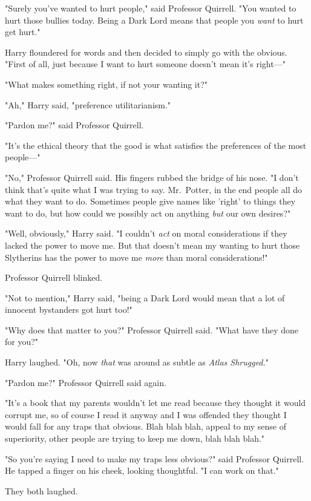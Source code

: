 "Surely you've wanted to hurt people," said Professor Quirrell. "You wanted to 
hurt those bullies today. Being a Dark Lord means that people you \emph{want} 
to hurt get hurt."

Harry floundered for words and then decided to simply go with the obvious. 
"First of all, just because I want to hurt someone doesn't mean it's right---"

"What makes something right, if not your wanting it?"

"Ah," Harry said, "preference utilitarianism."

"Pardon me?" said Professor Quirrell.

"It's the ethical theory that the good is what satisfies the preferences of the 
most people---"

"No," Professor Quirrell said. His fingers rubbed the bridge of his nose. "I 
don't think that's quite what I was trying to say. Mr.~Potter, in the end 
people all do what they want to do. Sometimes people give names like 'right' to 
things they want to do, but how could we possibly act on anything \emph{but} 
our own desires?"

"Well, obviously," Harry said. "I couldn't \emph{act} on moral considerations 
if they lacked the power to move me. But that doesn't mean my wanting to hurt 
those Slytherins has the power to move me \emph{more} than moral 
considerations!"

Professor Quirrell blinked.

"Not to mention," Harry said, "being a Dark Lord would mean that a lot of 
innocent bystanders got hurt too!"

"Why does that matter to you?" Professor Quirrell said. "What have they done 
for you?"

Harry laughed. "Oh, now \emph{that} was around as subtle as \emph{Atlas 
Shrugged.}"

"Pardon me?" Professor Quirrell said again.

"It's a book that my parents wouldn't let me read because they thought it would 
corrupt me, so of course I read it anyway and I was offended they thought I 
would fall for any traps that obvious. Blah blah blah, appeal to my sense of 
superiority, other people are trying to keep me down, blah blah blah."

"So you're saying I need to make my traps less obvious?" said Professor 
Quirrell. He tapped a finger on his cheek, looking thoughtful. "I can work on 
that."

They both laughed.


